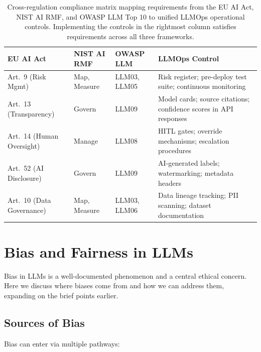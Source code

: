 \begin{table}[t]
\centering
\small
\caption{Cross-regulation compliance matrix mapping requirements from the EU AI Act, NIST AI RMF, and OWASP LLM Top 10 to unified LLMOps operational controls. Implementing the controls in the rightmost column satisfies requirements across all three frameworks.}
\label{tab:ch11_regulatory_mapping}
\setlength{\tabcolsep}{5pt}
\renewcommand{\arraystretch}{1.3}
\begin{tabularx}{\linewidth}{@{}>{\raggedright\arraybackslash}p{2.2cm}>{\raggedright\arraybackslash}p{2.2cm}>{\raggedright\arraybackslash}p{2.2cm}>{\raggedright\arraybackslash}X@{}}
\toprule
\rowcolor{gray!15}
\textbf{EU AI Act} & \textbf{NIST AI RMF} & \textbf{OWASP LLM} & \textbf{LLMOps Control} \\
\midrule
Art.\ 9 (Risk Mgmt) & Map, Measure & LLM03, LLM05 & Risk register; pre-deploy test suite; continuous monitoring \\
\addlinespace[2pt]
Art.\ 13 (Transparency) & Govern & LLM09 & Model cards; source citations; confidence scores in API responses \\
\addlinespace[2pt]
Art.\ 14 (Human Oversight) & Manage & LLM08 & HITL gates; override mechanisms; escalation procedures \\
\addlinespace[2pt]
Art.\ 52 (AI Disclosure) & Govern & LLM09 & AI-generated labels; watermarking; metadata headers \\
\addlinespace[2pt]
Art.\ 10 (Data Governance) & Map, Measure & LLM03, LLM06 & Data lineage tracking; PII scanning; dataset documentation \\
\bottomrule
\end{tabularx}
\end{table}

\section{Bias and Fairness in LLMs}\label{sec:ethics-bias}

Bias in LLMs is a well-documented phenomenon and a central ethical concern. Here we discuss where biases come from and how we can address them, expanding on the brief points earlier.

\subsection{Sources of Bias}

Bias can enter via multiple pathways:


